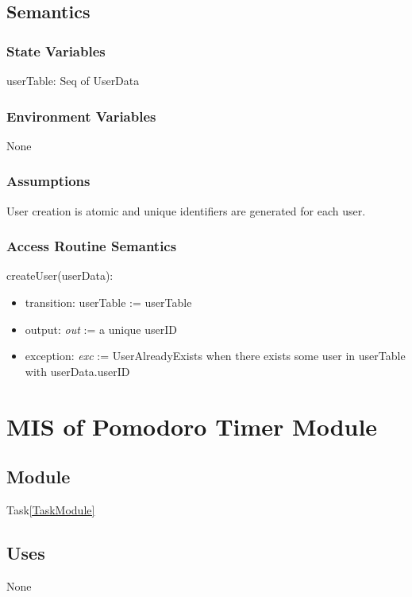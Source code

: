 \documentclass[12pt, titlepage]{article}
\begin{document}
\subsection{Semantics}

\subsubsection{State Variables}

userTable: Seq of UserData

\subsubsection{Environment Variables}

None

\subsubsection{Assumptions}

User creation is atomic and unique identifiers are generated for each user.

\subsubsection{Access Routine Semantics}

\noindent createUser(userData):
\begin{itemize}
\item transition: userTable := userTable 
\item output: \textit{out} := a unique userID
\item exception: \textit{exc} := UserAlreadyExists when there exists some user in userTable with userData.userID
\end{itemize}


\newpage
\section{MIS of Pomodoro Timer Module}
\label{PomodoroTimerModule}

\subsection{Module}
Task\ref{TaskModule}

\subsection{Uses}
None
\end{document}
